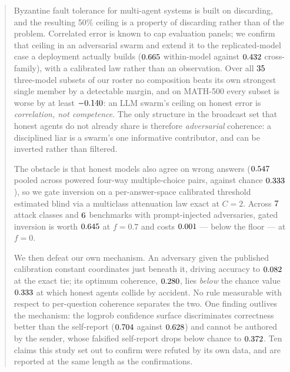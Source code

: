\begin{abstract}
Byzantine fault tolerance for multi-agent systems is built on discarding, and the
resulting 50\% ceiling is a property of discarding rather than of the problem.
Correlated error is known to cap
evaluation panels; we confirm that ceiling in an adversarial swarm and extend it
to the replicated-model case a deployment actually builds
($\numWithinModelPhi$ within-model against $\numCrossModelPhi$ cross-family),
with a calibrated law rather than an observation. Over all
$\numCompSubsetsThree$ three-model subsets of our roster no composition beats
its own strongest single member by a detectable margin, and on MATH-500 every
subset is worse by at least $\numCompBestGainMathfive$: an LLM swarm's ceiling on
honest error is \emph{correlation, not competence}. The only structure in the
broadcast set that honest agents do not already share is therefore
\emph{adversarial} coherence: a disciplined liar is a swarm's one informative
contributor, and can be inverted rather than filtered.

The obstacle is that honest models also agree on wrong answers
($\numHonestQMc$ pooled across powered four-way multiple-choice pairs, against
chance $\numMmluChanceQ$), so we gate inversion on a per-answer-space calibrated
threshold estimated blind via a multiclass attenuation law exact at $C=2$. Across
$\numAttackClasses$ attack classes and $\numBenchmarks$ benchmarks with
prompt-injected adversaries, gated inversion is worth $\numInversionGainFseven$
at $f=0.7$ and costs $\numInversionCostFzero$ --- below the floor --- at $f=0$.

We then defeat our own mechanism. An adversary given the published calibration
constant coordinates just beneath it, driving accuracy to $\numEvasionAccMedqa$
at the exact tie; its optimum coherence, $\numEvasionQMedqa$, lies \emph{below}
the chance value $\numEvasionChance$ at which honest agents collide by accident.
No rule measurable with respect to per-question coherence separates the two. One
finding outlives the mechanism: the logprob confidence surface discriminates
correctness better than the self-report ($\numAucLogprob$ against
$\numAucSelfReport$) and cannot be authored by the sender, whose falsified
self-report drops below chance to $\numAucSelfReportFalsified$. Ten claims this
study set out to confirm were refuted by its own data, and are reported at the
same length as the confirmations.
\end{abstract}
